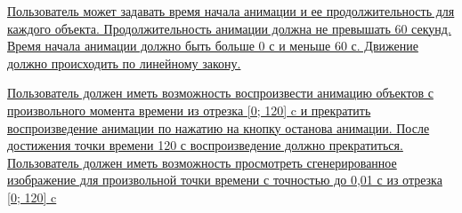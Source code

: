 \uline{\hspace*{1.25cm} Пользователь может задавать время начала анимации и ее продолжительность для каждого объекта. Продолжительность анимации должна не превышать 60 секунд. Время начала анимации должно быть больше 0 с и меньше 60 с. Движение должно происходить по линейному закону.
    \hfill}


\uline{\hspace*{1.25cm} Пользователь должен иметь возможность воспроизвести анимацию объектов с произвольного момента времени из отрезка [0; 120] c  и прекратить воспроизведение анимации по нажатию на кнопку останова анимации. После достижения точки времени 120 с воспроизведение должно прекратиться. Пользователь должен иметь возможность просмотреть сгенерированное изображение для произвольной точки времени с точностью до 0,01 с из отрезка [0; 120] c \hfill}


\endgroup
\normalsize
